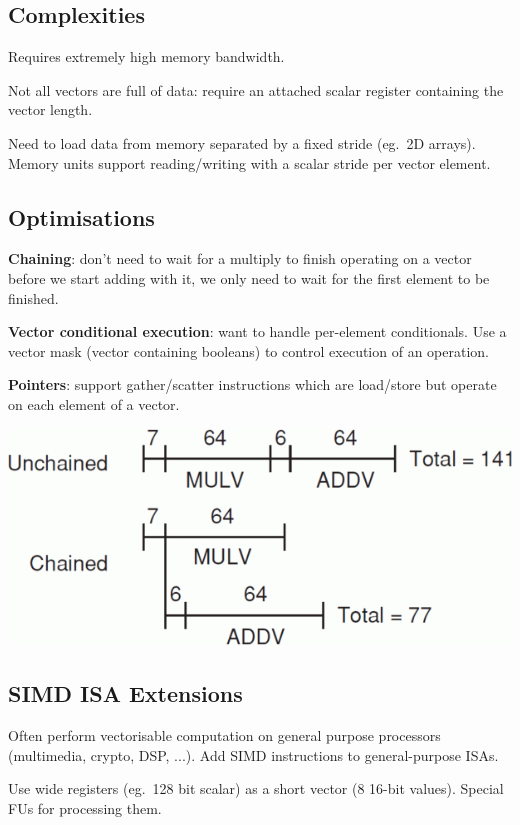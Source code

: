 \documentclass[11pt]{article}
\begin{document}
{    \subsection*{Complexities}
    {
        Requires extremely high memory bandwidth.

        Not all vectors are full of data: require an attached scalar register containing the vector length.

        Need to load data from memory separated by a fixed stride (eg.\ 2D arrays). Memory units support reading/writing with a scalar stride per vector element.
    }
    \subsection*{Optimisations}
    {
        \begin{minipage}[t]{0.6\textwidth}
        \textbf{Chaining}: don't need to wait for a multiply to finish operating on a vector before we start adding with it, we only need to wait for the first element to be finished.

        \textbf{Vector conditional execution}: want to handle per-element conditionals. Use a vector mask (vector containing booleans) to control execution of an operation.

        \textbf{Pointers}: support gather/scatter instructions which are load/store but operate on each element of a vector.
        \end{minipage}
        \hspace{5mm}
        \begin{minipage}[t]{0.35\textwidth}
        \vspace{0pt}
        \centering
        \includegraphics[width=\textwidth]{vector-chaining.png}
        \end{minipage}
    }
    \subsection*{SIMD ISA Extensions}
    {
        Often perform vectorisable computation on general purpose processors (multimedia, crypto, DSP, ...). Add SIMD instructions to general-purpose ISAs.

        Use wide registers (eg.\ 128 bit scalar) as a short vector (8 16-bit values). Special FUs for processing them.
    }
}
\end{document}
